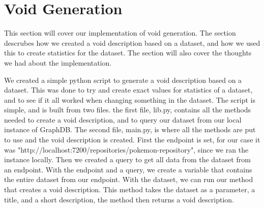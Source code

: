 \section{Void Generation}\label{sec:void}

This section will cover our implementation of void generation. The section descrubes how we created a void description based on a dataset, and how we used this to create statistics for the dataset. The section will also cover the thoughts we had about the implementation.

We created a simple python script to generate a void description based on a dataset. This was done to try and create exact values for statistics of a dataset, and to see if it all worked when changing something in the dataset. The script is simple, and is built from two files. the first file, lib.py, contains all the methods needed to create a void description, and to query our dataset from our local instance of GraphDB. The second file, main.py, is where all the methods are put to use and the void description is created. First the endpoint is set, for our case it was "http://localhost:7200/repositories/pokemon-repository", since we ran the instance locally. Then we created a query to get all data from the dataset from an endpoint. With the endpoint and a query, we create a variable that contains the entire dataset from our endpoint. With the dataset, we can run our method that creates a void description. This method takes the dataset as a parameter, a title, and a short description, the method then returns a void description.

